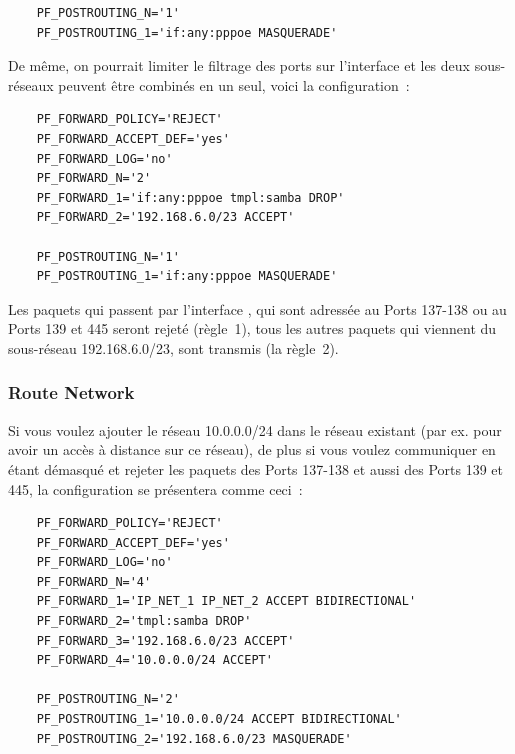 \begin{example}
\begin{verbatim}
    PF_POSTROUTING_N='1'
    PF_POSTROUTING_1='if:any:pppoe MASQUERADE'
\end{verbatim}
\end{example}

De même, on pourrait limiter le filtrage des ports sur l'interface 
et les deux sous-réseaux peuvent être combinés en un seul, voici la configuration~:

\begin{example}
\begin{verbatim}
    PF_FORWARD_POLICY='REJECT'
    PF_FORWARD_ACCEPT_DEF='yes'
    PF_FORWARD_LOG='no'
    PF_FORWARD_N='2'
    PF_FORWARD_1='if:any:pppoe tmpl:samba DROP'
    PF_FORWARD_2='192.168.6.0/23 ACCEPT'

    PF_POSTROUTING_N='1'
    PF_POSTROUTING_1='if:any:pppoe MASQUERADE'
\end{verbatim}
\end{example}

Les paquets qui passent par l'interface , qui sont adressée
au  Ports 137-138 ou au  Ports 139 et 445 seront
rejeté (règle~1), tous les autres paquets qui viennent du sous-réseau 
192.168.6.0/23, sont transmis (la règle~2).

\subsubsection{Route Network}

Si vous voulez ajouter le réseau 10.0.0.0/24 dans le réseau existant (par ex.
pour avoir un accès à distance sur ce réseau), de plus si vous voulez
communiquer en étant démasqué et rejeter les paquets des 
Ports 137-138 et aussi des Ports 139 et 445, la configuration
se présentera comme ceci~:

\begin{example}
\begin{verbatim}
    PF_FORWARD_POLICY='REJECT'
    PF_FORWARD_ACCEPT_DEF='yes'
    PF_FORWARD_LOG='no'
    PF_FORWARD_N='4'
    PF_FORWARD_1='IP_NET_1 IP_NET_2 ACCEPT BIDIRECTIONAL'
    PF_FORWARD_2='tmpl:samba DROP'
    PF_FORWARD_3='192.168.6.0/23 ACCEPT'
    PF_FORWARD_4='10.0.0.0/24 ACCEPT'

    PF_POSTROUTING_N='2'
    PF_POSTROUTING_1='10.0.0.0/24 ACCEPT BIDIRECTIONAL'
    PF_POSTROUTING_2='192.168.6.0/23 MASQUERADE'
\end{verbatim}
\end{example}

